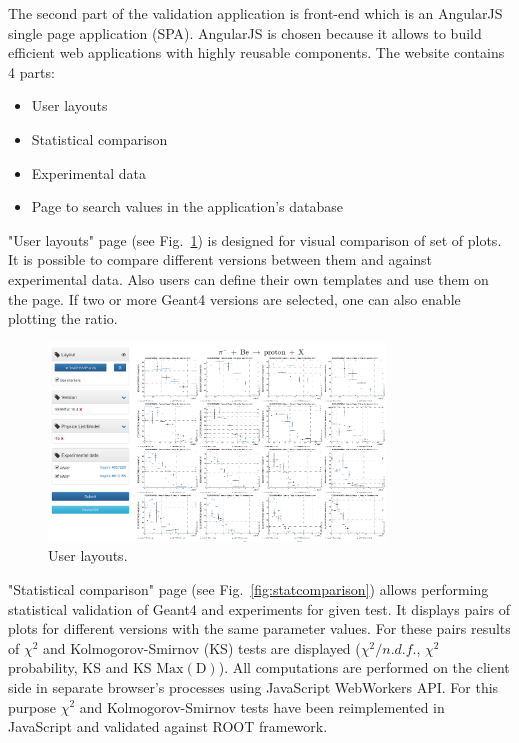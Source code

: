 The second part of the validation application is front-end which is an AngularJS single page application (SPA).
AngularJS is chosen because it allows to build efficient web applications with highly reusable components.
The website contains 4 parts:

\begin{itemize}
    \item User layouts
    \item Statistical comparison
    \item Experimental data
    \item Page to search values in the application's database
\end{itemize}

"User layouts" page (see Fig.~\ref{fig:layouts}) is designed for visual comparison of set of plots. It is possible to compare different versions between them and against experimental data. Also users can define their own templates and use them on the page. 
If two or more Geant4 versions are selected, one can also enable plotting the ratio.

\begin{figure}[h]
    \centering
    \includegraphics[width=0.8\textwidth,clip]{layouts.png}
    \caption{User layouts.}
    \label{fig:layouts}
\end{figure}

"Statistical comparison" page (see Fig.~\ref{fig:statcomparison}) allows performing statistical validation of Geant4 and experiments for given test. It displays pairs of plots for different versions with the same parameter values. For these pairs results of $\chi^2$ and Kolmogorov-Smirnov (KS) tests are displayed ($\chi^2/n.d.f.$, $\chi^2$ probability, KS and KS $\mathrm{Max(D)}$). All computations are performed on the client side in separate browser's processes using JavaScript WebWorkers API.
For this purpose $\chi^2$ and Kolmogorov-Smirnov tests have been reimplemented in JavaScript and validated against ROOT framework.

